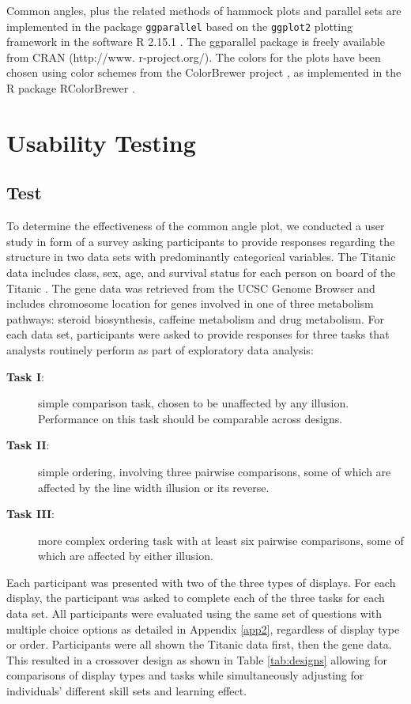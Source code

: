 \documentclass[journal]{vgtc}\usepackage{graphicx, color}
\begin{document}
Common angles, plus the related methods of hammock plots and parallel sets are implemented in the  package \texttt{ggparallel} based on the \texttt{ggplot2} \cite{ggplot2} plotting framework in the software R 2.15.1 \cite{R}. The ggparallel package is freely available from CRAN (http://www. r-project.org/). The colors for the plots have been chosen using color schemes from the ColorBrewer project \cite{colorbrewer}, as implemented in the R package RColorBrewer \cite{RColorBrewer}.

\section{Usability Testing}
\subsection{Test} \label{test}

To determine the effectiveness of the common angle plot, we conducted a user study in form of a survey asking participants to provide responses regarding the structure in two data sets with predominantly categorical variables. The Titanic data  includes class, sex, age, and survival status for each person on board of the Titanic \cite{dawson:1995}. The gene data  was retrieved from the UCSC Genome Browser \cite{ucsc:2002} and includes chromosome location for genes involved in one of three metabolism pathways: steroid biosynthesis, caffeine metabolism and drug metabolism.
For each data set, participants were asked to provide responses for three tasks that analysts routinely perform as part of exploratory data analysis:
\begin{description}
\item[{\bf Task I}:] simple comparison task, chosen to be unaffected by any illusion. Performance on this task should be comparable across designs.
\item[{\bf Task II}:] simple ordering, involving three pairwise comparisons, some of which are affected by the line width illusion or its reverse. 

\item[{\bf Task III}:] more complex ordering task with at least six pairwise comparisons, some of which are affected by either illusion.
 \end{description}
 
Each participant was presented with two of the three types of displays. For each display, the participant was asked to complete each of the three tasks for each data set. All participants were evaluated using the same set of questions with multiple choice options as detailed in Appendix \ref{app2}, regardless of display type or order. Participants were all shown the Titanic data first, then the gene data.  %
This resulted in a crossover design as shown in Table \ref{tab:designs} allowing for comparisons of display types and tasks while  simultaneously adjusting for individuals' different skill sets and learning effect.
\end{document}
